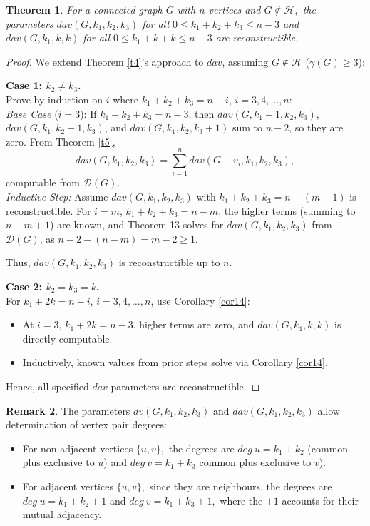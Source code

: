 \documentclass[11pt,oneside]{article}
\newtheorem{thm}{Theorem}
\theoremstyle{definition}
\newtheorem{rem}[thm]{Remark}
\begin{document}
\begin{thm}\label{t6}
For a connected graph $G$ with $n$ vertices and $G \notin \mathcal{H},$ the parameters $dav(G,k_1,k_2,k_3)$ for all $0 \leq k_1+k_2+k_3 \leq n-3$ and $dav(G,k_1,k,k)$ for all $0 \leq k_1+k+k \leq n-3$ are reconstructible.
\end{thm}
\begin{proof}
We extend Theorem \ref{t4}'s approach to \( dav \), assuming \( G \notin \mathcal{H} \) (\( \gamma(G) \geq 3 \)):


\noindent\textbf{Case 1: \( k_2 \neq k_3 \).}\\
 Prove by induction on \( i \) where \( k_1 + k_2 + k_3 = n - i \), \( i = 3, 4, \ldots, n\):\\
\textit{Base Case} (\( i = 3 \)): 
If \( k_1 + k_2 + k_3 = n - 3 \), then \( dav(G, k_1 + 1, k_2, k_3) \), \( dav(G, k_1, k_2 + 1, k_3) \), and \( dav(G, k_1, k_2, k_3 + 1) \) sum to \( n-2 \), so they are zero. From Theorem \ref{t5},
    \[
    dav(G, k_1, k_2, k_3) = \sum_{i=1}^n dav(G - v_i, k_1, k_2, k_3),
    \]
    computable from \( \mathscr{D}(G) \).\\
 \textit{Inductive Step:} Assume \( dav(G, k_1, k_2, k_3) \) with \( k_1 + k_2 + k_3 = n - (m - 1) \) is reconstructible. For \( i = m \), \( k_1 + k_2 + k_3 = n - m \), the higher terms (summing to \( n - m + 1 \)) are known, and Theorem 13 solves for \( dav(G, k_1, k_2, k_3) \) from \( \mathscr{D}(G) \), as \( n - 2 - (n - m) = m - 2 \geq 1 \).

Thus, \( dav(G, k_1, k_2, k_3) \) is reconstructible up to \( n\).

\noindent\textbf{Case 2: \( k_2 = k_3 = k \).} \\
For \( k_1 + 2k = n - i \), \( i = 3, 4, \ldots, n \), use Corollary \ref{cor14}:

\begin{itemize}
        \item At \( i = 3 \), \( k_1 + 2k = n - 3 \), higher terms are zero, and \( dav(G, k_1, k, k) \) is directly computable.
        \item Inductively, known values from prior steps solve via Corollary \ref{cor14}.
 \end{itemize}

Hence, all specified \( dav \) parameters are reconstructible.
\end{proof}

\begin{rem}
The parameters $dv(G,k_1,k_2,k_3)$ and $dav(G,k_1,k_2,k_3)$ allow determination of vertex pair degrees:
\begin{itemize}
\item For non-adjacent vertices $\{u, v\},$ the degrees are $deg~u=k_1+k_2$ (common plus exclusive to $u$) and $deg ~v=k_1+k_3$ common plus exclusive to $v$).

\item For adjacent vertices $\{u, v\},$  since they are neighbours, the degrees are $deg~ u=k_1+k_2+1$ and  $deg~v=k_1+k_3+1,$ where the $+1$ accounts for their mutual adjacency. 
  \end{itemize} 
\end{rem}
\end{document}
